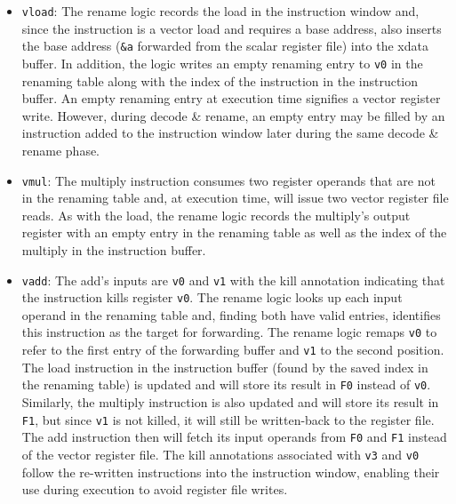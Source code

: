 \begin{itemize}
\item {\tt vload}:
The rename logic records the load in the instruction window and, since the instruction
is a vector load and requires a base address, also inserts the base address ({\tt \&a} forwarded from the scalar register file) into the xdata buffer.
% 
In addition, the logic writes an empty renaming entry to {\tt v0} in the renaming table along with the index of the instruction in the instruction buffer.
%
An empty renaming entry at execution time signifies a vector register write.
However, during decode \& rename, an empty entry may be filled by an instruction added to
the instruction window later during the same decode \& rename phase.
\item {\tt vmul}: The multiply instruction consumes two register operands that are not in the renaming table and, at execution time, will issue
two vector register file reads.
%
As with the load, the rename logic records the multiply's output register with 
an empty entry in the renaming table as well as the index of the multiply in the
instruction buffer.
\item {\tt vadd}:
The add's inputs are {\tt v0} and {\tt v1} with the kill annotation indicating
that the instruction kills register {\tt v0}.
%
The rename logic looks up each input operand in the renaming table and, finding 
both have valid entries, identifies this instruction as the target for forwarding.
%
The rename logic remaps {\tt v0} to refer to the first entry of the forwarding
buffer and {\tt v1} to the second position. 
%
The load instruction in the instruction buffer (found by the saved index in the renaming table) 
is updated and will store its result in {\tt F0} instead of {\tt v0}.
%
Similarly, the multiply instruction is also updated and will store its result in {\tt F1}, but since {\tt v1} is not killed, it will still be written-back to the register file. 
%
The add instruction then will fetch its input operands from {\tt F0}
and {\tt F1} instead of the vector register file.
%
The kill annotations associated with {\tt v3} and {\tt v0} follow the re-written
instructions into the instruction window, enabling their use during execution
to avoid register file writes.
\end{itemize}

\figMANICMANICb

